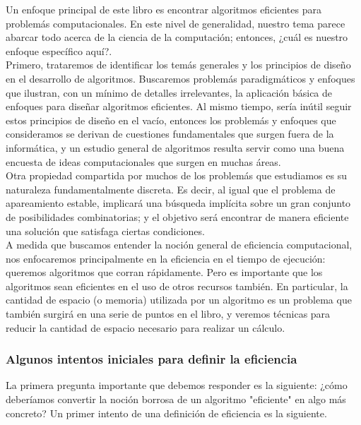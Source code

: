 \documentclass[a4paper]{article}
\begin{document}
Un enfoque principal de este libro es encontrar algoritmos eficientes para problemás computacionales. En este nivel de generalidad, nuestro tema parece abarcar todo acerca de la ciencia de la computación; entonces, ¿cuál es nuestro enfoque específico aquí?. \\

Primero, trataremos de identificar los temás generales y los principios de diseño en el desarrollo de algoritmos. Buscaremos problemás paradigmáticos y enfoques que ilustran, con un mínimo de detalles irrelevantes, la aplicación básica de enfoques para diseñar algoritmos eficientes. Al mismo tiempo, sería inútil seguir estos principios de diseño en el vacío, entonces los problemás y enfoques que consideramos se derivan de cuestiones fundamentales que surgen fuera de la informática, y un estudio general de algoritmos resulta servir como una buena encuesta de ideas computacionales que surgen en muchas áreas. \\

Otra propiedad compartida por muchos de los problemás que estudiamos es su naturaleza fundamentalmente discreta. Es decir, al igual que el problema de apareamiento estable, implicará una búsqueda implícita sobre un gran conjunto de posibilidades combinatorias; y el objetivo será encontrar de manera eficiente una solución que satisfaga ciertas condiciones. \\

A medida que buscamos entender la noción general de eficiencia computacional, nos enfocaremos principalmente en la eficiencia en el tiempo de ejecución: queremos algoritmos que corran rápidamente. Pero es importante que los algoritmos sean eficientes en el uso de otros recursos también. En particular, la cantidad de espacio (o memoria) utilizada por un algoritmo es un problema que también surgirá en una serie de puntos en el libro, y veremos técnicas para reducir la cantidad de espacio necesario para realizar un cálculo.\\

\subsubsection*{Algunos intentos iniciales para definir la eficiencia}

La primera pregunta importante que debemos responder es la siguiente: ¿cómo deberíamos convertir la noción borrosa de un algoritmo "eficiente" en algo más concreto? 
Un primer intento de una definición de eficiencia es la siguiente. \\
\end{document}
